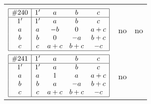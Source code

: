 \documentclass[12pt]{article}
\theoremstyle{definition}
\newcommand{\join}{\mathbin{+}}%
\newcommand{\id}{{1'}}%
\renewcommand{\top}{1}%
\begin{document}
\begin{center}
\begin{longtable}{l|c|c}
{\begin{tikzpicture}[<->,shorten <=1pt,shorten >=1pt,label distance=0mm, font=\small]
\end{tikzpicture}
}      \\[15mm]

$
\begin{array}{|c|cccc|} \hline
\#240 & \id & a & b & c \\ \hline
\id & \id & a & b & c \\
a & a & -b & 0 & a \join c \\
b & b & 0 & -a & b \join c \\
c & c & a \join c & b \join c & -c \\ \hline
\end{array}
$
 & no  
 & no      \\[15mm]

$
\begin{array}{|c|cccc|} \hline
\#241 & \id & a & b & c \\ \hline
\id & \id & a & b & c \\
a & a & \top & a & a \join c \\
b & b & a & -a & b \join c \\
c & c & a \join c & b \join c & -c \\ \hline
\end{array}
$
 & no  
 & \adjustbox{valign=c, max height=1.6cm}{$
\left[ \begin{array}{ccccccc}
\id & a & a & b & c & a & b \\ 
a & \id & a & a & a & c & a \\ 
a & a & \id & a & a & c & a \\ 
b & a & a & \id & b & a & b \\ 
c & a & a & b & \id & a & c \\ 
a & c & c & a & a & \id & a \\ 
b & a & a & b & c & a & \id
\end{array}\right]
$}      \\[15mm]


\end{longtable}
\end{center}
\end{document}
